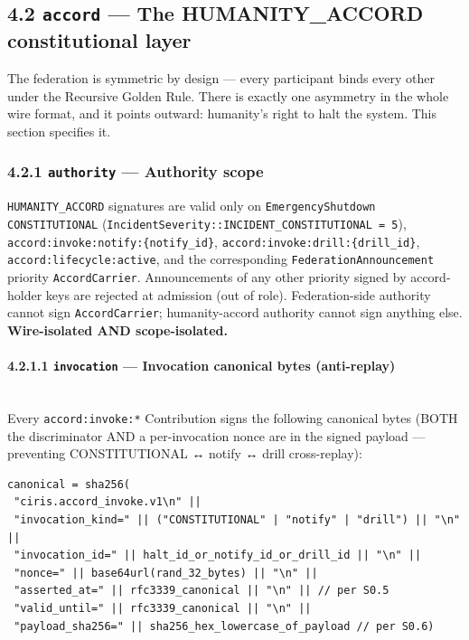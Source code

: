 \documentclass[11pt]{article}
\begin{document}
\subsection*{4.2 \texttt{accord} — The HUMANITY\_ACCORD constitutional layer}


The federation is symmetric by design — every participant binds every other under the Recursive Golden Rule. There is exactly one asymmetry in the whole wire format, and it points outward: humanity's right to halt the system. This section specifies it.


\subsubsection*{4.2.1 \texttt{authority} — Authority scope}


\texttt{HUMANITY\_ACCORD} signatures are valid only on \texttt{EmergencyShutdown CONSTITUTIONAL} (\texttt{IncidentSeverity::INCIDENT\_CONSTITUTIONAL = 5}), \texttt{accord:invoke:notify:\{notify\_id\}}, \texttt{accord:invoke:drill:\{drill\_id\}}, \texttt{accord:lifecycle:active}, and the corresponding \texttt{FederationAnnouncement} priority \texttt{AccordCarrier}. Announcements of any other priority signed by accord-holder keys are rejected at admission (out of role). Federation-side authority cannot sign \texttt{AccordCarrier}; humanity-accord authority cannot sign anything else. \textbf{Wire-isolated AND scope-isolated.}


\paragraph{4.2.1.1 \texttt{invocation} — Invocation canonical bytes (anti-replay)}\mbox{}\\


Every \texttt{accord:invoke:*} Contribution signs the following canonical bytes (BOTH the discriminator AND a per-invocation nonce are in the signed payload — preventing CONSTITUTIONAL ↔ notify ↔ drill cross-replay):


\begin{lstlisting}
canonical = sha256(
 "ciris.accord_invoke.v1\n" ||
 "invocation_kind=" || ("CONSTITUTIONAL" | "notify" | "drill") || "\n" ||
 "invocation_id=" || halt_id_or_notify_id_or_drill_id || "\n" ||
 "nonce=" || base64url(rand_32_bytes) || "\n" ||
 "asserted_at=" || rfc3339_canonical || "\n" || // per S0.5
 "valid_until=" || rfc3339_canonical || "\n" ||
 "payload_sha256=" || sha256_hex_lowercase_of_payload // per S0.6)
\end{lstlisting}
\end{document}
